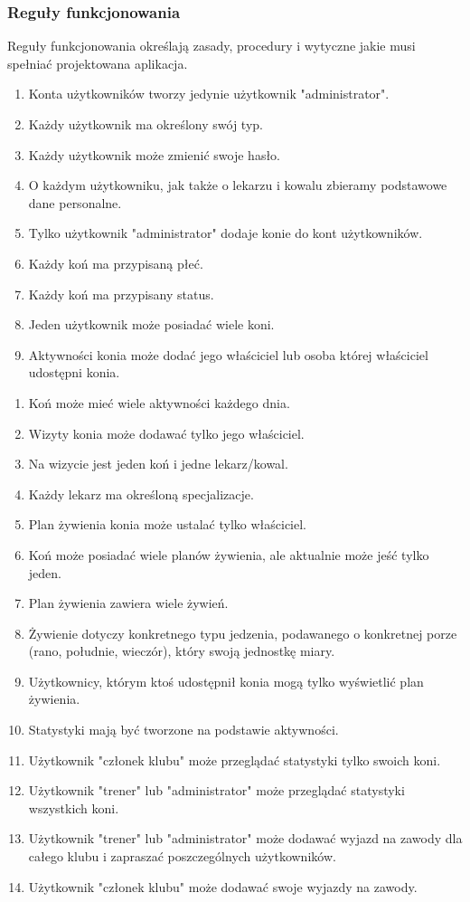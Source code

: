 \documentclass[12pt,twoside]{report}
\begin{document}
\subsubsection{Reguły funkcjonowania}
Reguły funkcjonowania określają zasady, procedury i wytyczne jakie musi spełniać projektowana aplikacja. 
\begin{enumerate}[start=1,label={\bfseries REG\textbackslash 00\arabic*}]
	\item Konta użytkowników tworzy jedynie użytkownik "administrator".
	\item Każdy użytkownik ma określony swój typ.
	\item Każdy użytkownik może zmienić swoje hasło.
	\item O każdym użytkowniku, jak także o lekarzu i kowalu zbieramy podstawowe dane personalne.
	\item Tylko użytkownik "administrator" dodaje konie do kont użytkowników.
	\item Każdy koń ma przypisaną płeć.
	\item Każdy koń ma przypisany status.
	\item Jeden użytkownik może posiadać wiele koni.
	\item Aktywności konia może dodać jego właściciel lub osoba której właściciel udostępni konia.
\end{enumerate}
\begin{enumerate}[start=10,label={\bfseries REG\textbackslash 0\arabic*}]
	\item Koń może mieć wiele aktywności każdego dnia.
	\item Wizyty konia może dodawać tylko jego właściciel.
	\item Na wizycie jest jeden koń i jedne lekarz/kowal.
	\item Każdy lekarz ma określoną specjalizacje.
	\item Plan żywienia konia może ustalać tylko właściciel. 
	\item Koń może posiadać wiele planów żywienia, ale aktualnie może jeść tylko jeden.
	\item Plan żywienia zawiera wiele żywień.
	\item Żywienie dotyczy konkretnego typu jedzenia, podawanego o konkretnej porze (rano, południe, wieczór), który swoją jednostkę miary.
	\item Użytkownicy, którym ktoś udostępnił konia mogą tylko wyświetlić plan żywienia.
	\item Statystyki mają być tworzone na podstawie aktywności.
	\item Użytkownik "członek klubu" może przeglądać statystyki tylko swoich koni.
	\item Użytkownik "trener" lub "administrator" może przeglądać statystyki wszystkich koni.
	\item Użytkownik "trener" lub "administrator" może dodawać wyjazd na zawody dla całego klubu i zapraszać poszczególnych użytkowników.
	\item Użytkownik "członek klubu" może dodawać swoje wyjazdy na zawody.
\end{enumerate}
\newpage
\end{document}
